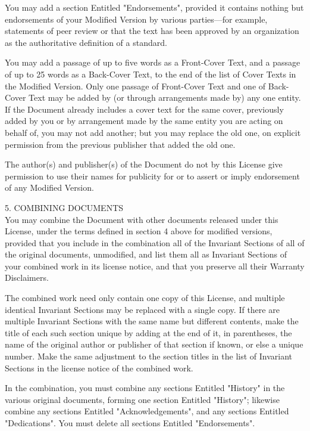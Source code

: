 \documentclass[oneside,12pt]{memoir} %
\begin{document}
You may add a section Entitled "Endorsements", provided it contains nothing but endorsements of your Modified Version by various parties—for example, statements of peer review or that the text has been approved by an organization as the authoritative definition of a standard.

You may add a passage of up to five words as a Front-Cover Text, and a passage of up to 25 words as a Back-Cover Text, to the end of the list of Cover Texts in the Modified Version. Only one passage of Front-Cover Text and one of Back-Cover Text may be added by (or through arrangements made by) any one entity. If the Document already includes a cover text for the same cover, previously added by you or by arrangement made by the same entity you are acting on behalf of, you may not add another; but you may replace the old one, on explicit permission from the previous publisher that added the old one.

The author(s) and publisher(s) of the Document do not by this License give permission to use their names for publicity for or to assert or imply endorsement of any Modified Version.

5. COMBINING DOCUMENTS\\

You may combine the Document with other documents released under this License, under the terms defined in section 4 above for modified versions, provided that you include in the combination all of the Invariant Sections of all of the original documents, unmodified, and list them all as Invariant Sections of your combined work in its license notice, and that you preserve all their Warranty Disclaimers.

The combined work need only contain one copy of this License, and multiple identical Invariant Sections may be replaced with a single copy. If there are multiple Invariant Sections with the same name but different contents, make the title of each such section unique by adding at the end of it, in parentheses, the name of the original author or publisher of that section if known, or else a unique number. Make the same adjustment to the section titles in the list of Invariant Sections in the license notice of the combined work.

In the combination, you must combine any sections Entitled "History" in the various original documents, forming one section Entitled "History"; likewise combine any sections Entitled "Acknowledgements", and any sections Entitled "Dedications". You must delete all sections Entitled "Endorsements".
\end{document}
